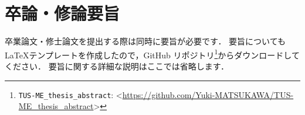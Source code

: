 

\section{卒論・修論要旨}
\label{sec:abstract}

卒業論文・修士論文を提出する際は同時に要旨が必要です．
要旨についても \LaTeX テンプレートを作成したので，GitHub リポジトリ\footnote{\texttt{TUS-ME\_thesis\_abstract}: \textless\url{https://github.com/Yuki-MATSUKAWA/TUS-ME_thesis_abstract}\textgreater}からダウンロードしてください．
要旨に関する詳細な説明はここでは省略します．

